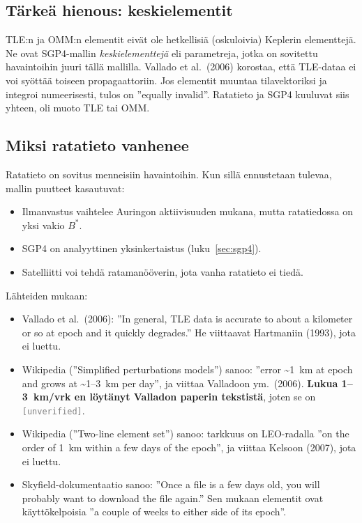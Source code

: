 \documentclass[a4paper,11pt]{article}
\newcommand{\unverified}[1][]{\textcolor{gray}{\texttt{[unverified#1]}}}
\begin{document}
\subsection{Tärkeä hienous: keskielementit}

TLE:n ja OMM:n elementit eivät ole hetkellisiä (oskuloivia) Keplerin elementtejä. Ne ovat SGP4-mallin \emph{keskielementtejä} eli parametreja, jotka on sovitettu havaintoihin juuri tällä mallilla. Vallado et al.\ (2006) korostaa, että TLE-dataa ei voi syöttää toiseen propagaattoriin. Jos elementit muuntaa tilavektoriksi ja integroi numeerisesti, tulos on ”equally invalid”. Ratatieto ja SGP4 kuuluvat siis yhteen, oli muoto TLE tai OMM.

\subsection{Miksi ratatieto vanhenee}

Ratatieto on sovitus menneisiin havaintoihin. Kun sillä ennustetaan tulevaa, mallin puutteet kasautuvat:
\begin{itemize}
  \item Ilmanvastus vaihtelee Auringon aktiivisuuden mukana, mutta ratatiedossa on yksi vakio $B^*$.
  \item SGP4 on analyyttinen yksinkertaistus (luku~\ref{sec:sgp4}).
  \item Satelliitti voi tehdä ratamanööverin, jota vanha ratatieto ei tiedä.
\end{itemize}

Lähteiden mukaan:
\begin{itemize}
  \item Vallado et al.\ (2006): ”In general, TLE data is accurate to about a kilometer or so at epoch and it quickly degrades.” He viittaavat Hartmaniin (1993), jota ei luettu.
  \item Wikipedia (”Simplified perturbations models”) sanoo: ”error \textasciitilde1~km at epoch and grows at \textasciitilde1–3~km per day”, ja viittaa Valladoon ym.\ (2006). \textbf{Lukua 1–3~km/vrk en löytänyt Valladon paperin tekstistä}, joten se on \unverified.
  \item Wikipedia (”Two-line element set”) sanoo: tarkkuus on LEO-radalla ”on the order of 1~km within a few days of the epoch”, ja viittaa Kelsoon (2007), jota ei luettu.
  \item Skyfield-dokumentaatio sanoo: ”Once a file is a few days old, you will probably want to download the file again.” Sen mukaan elementit ovat käyttökelpoisia ”a couple of weeks to either side of its epoch”.
\end{itemize}
\end{document}
